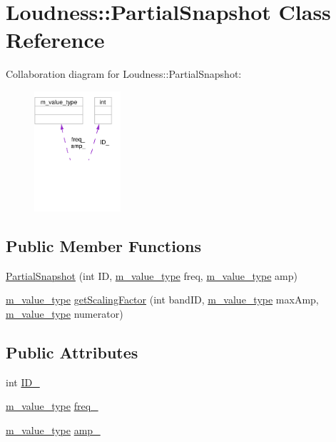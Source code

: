 \hypertarget{classLoudness_1_1PartialSnapshot}{
\section{Loudness::Partial\-Snapshot Class Reference}
\label{classLoudness_1_1PartialSnapshot}
}
Collaboration diagram for Loudness::Partial\-Snapshot:\begin{figure}[H]
\begin{center}
\leavevmode
\includegraphics[width=91pt]{classLoudness_1_1PartialSnapshot__coll__graph}
\end{center}
\end{figure}
\subsection*{Public Member Functions}
\begin{CompactItemize}
\item 
\hyperlink{classLoudness_1_1PartialSnapshot_a0}{Partial\-Snapshot} (int ID, \hyperlink{Types_8h_a3}{m\_\-value\_\-type} freq, \hyperlink{Types_8h_a3}{m\_\-value\_\-type} amp)
\item 
\hyperlink{Types_8h_a3}{m\_\-value\_\-type} \hyperlink{classLoudness_1_1PartialSnapshot_a1}{get\-Scaling\-Factor} (int band\-ID, \hyperlink{Types_8h_a3}{m\_\-value\_\-type} max\-Amp, \hyperlink{Types_8h_a3}{m\_\-value\_\-type} numerator)
\end{CompactItemize}
\subsection*{Public Attributes}
\begin{CompactItemize}
\item 
int \hyperlink{classLoudness_1_1PartialSnapshot_o0}{ID\_\-}
\item 
\hyperlink{Types_8h_a3}{m\_\-value\_\-type} \hyperlink{classLoudness_1_1PartialSnapshot_o1}{freq\_\-}
\item 
\hyperlink{Types_8h_a3}{m\_\-value\_\-type} \hyperlink{classLoudness_1_1PartialSnapshot_o2}{amp\_\-}
\end{CompactItemize}



